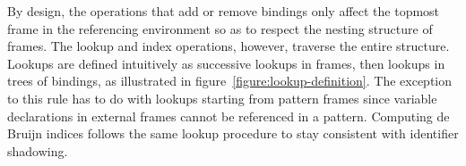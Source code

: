 By design, the operations that add or remove bindings only affect the topmost frame in the referencing environment so as to respect the nesting structure of frames.
The lookup and index operations, however, traverse the entire structure.
Lookups are defined intuitively as successive lookups in frames, then lookups in trees of bindings, as illustrated in figure~\ref{figure:lookup-definition}.
The exception to this rule has to do with lookups starting from pattern frames since variable declarations in external frames cannot be referenced in a pattern.
Computing de Bruijn indices follows the same lookup procedure to stay consistent with identifier shadowing.

\begin{figure}[H]
\centering
{\footnotesize
{}}
\end{figure}
